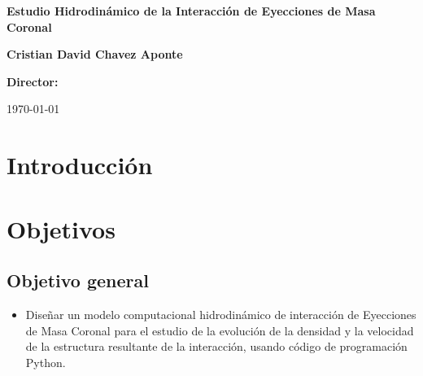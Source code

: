 






\begin{center}
  \vspace*{0cm}
  {\Huge \textbf{{Estudio Hidrodinámico de la Interacción de Eyecciones de Masa Coronal}} \par}
  \vspace{1cm}
{{
\large \par \textbf{{Cristian David Chavez Aponte}} \par}

 \large \textbf{Director:} \par \tutor \par}
  \vspace{1cm}
  {\Large \universidad \par}
  \vspace{0.5cm}
  {\large \facultad \par}
  \vspace{0.5cm}
  {\large \lugar \par}
  \vspace{0.5cm}
  {\large \today}
\end{center}


\section{Introducción}


\section{Objetivos}

\subsection{Objetivo general}
\begin{itemize}
\item Diseñar un modelo computacional hidrodinámico de interacción de Eyecciones de Masa Coronal para el estudio de la evolución de la densidad y la velocidad de la estructura resultante de la interacción, usando código de programación Python.
\end{itemize}
